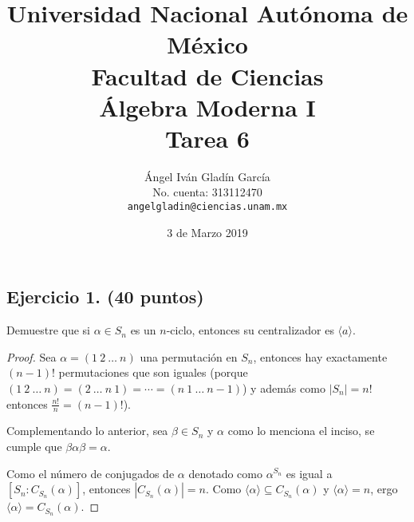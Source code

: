 \documentclass[12pt,letterpaper]{article}
\begin{document}
\title{
    \vspace{-2.2em}
        Universidad Nacional Autónoma de México\\
        Facultad de Ciencias\\
        Álgebra Moderna I\\
    \vspace{.5cm}
    \large
        \textbf{Tarea 6}
}
\author{
    Ángel Iván Gladín García\\
    No. cuenta: 313112470\\
    \texttt{angelgladin@ciencias.unam.mx}
}
\date{3 de Marzo 2019}
\maketitle

\newtheorem{theorem}{Teorema}
\newtheorem{example}{Ejemplo}
\newtheorem{corollary}{Corolario}
\newtheorem{lemma}{Lemma}
\newtheorem{definition}{Definicion}
\newtheorem{prop}{Proposicion}

\subsection*{Ejercicio 1. (40 puntos)}
Demuestre que si $\alpha \in S_n$ es un $n$-ciclo, entonces su centralizador es $\langle a \rangle$.

\begin{proof}

Sea $\alpha = (1 \ 2 \ \ldots \ n)$ una permutación en $S_n$, entonces hay exactamente $(n-1)!$ permutaciones
que son iguales (porque $(1 \ 2 \ \ldots \ n) = (2 \ \ldots \ n \ 1) = \cdots 
= (n \ 1 \  \ldots \ n-1)$) y además como $|S_n| = n!$ entonces $\frac{n!}{n} = (n-1)!$).

Complementando lo anterior, sea $\beta \in S_n$ y $\alpha$ como lo menciona el inciso, se cumple que
$\beta \alpha \beta = \alpha$.

Como el número de conjugados de $\alpha$ denotado como $\alpha^{S_n}$ es igual a
$[S_n : C_{S_n}(\alpha)]$, entonces $|C_{S_n}(\alpha)| = n$.
Como $\langle \alpha \rangle \subseteq C_{S_n}(\alpha)$ y $\langle \alpha \rangle = n$,
ergo $\langle \alpha \rangle = C_{S_n}(\alpha)$.
\end{proof}
\end{document}
